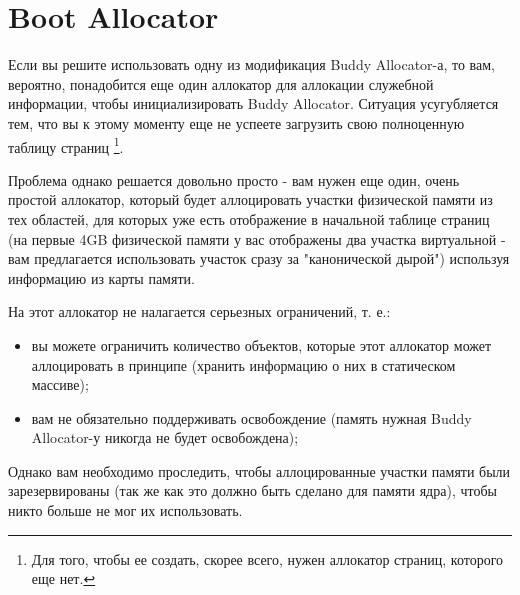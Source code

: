 \section{Boot Allocator}

Если вы решите использовать одну из модификация Buddy Allocator-а, то вам,
вероятно, понадобится еще один аллокатор для аллокации служебной информации,
чтобы инициализировать Buddy Allocator. Ситуация усугубляется тем, что вы к
этому моменту еще не успеете загрузить свою полноценную таблицу страниц
\footnote{Для того, чтобы ее создать, скорее всего, нужен аллокатор страниц,
которого еще нет.}.

Проблема однако решается довольно просто - вам нужен еще один, очень простой
аллокатор, который будет аллоцировать участки физической памяти из тех областей,
для которых уже есть отображение в начальной таблице страниц (на первые 4GB
физической памяти у вас отображены два участка виртуальной - вам предлагается
использовать участок сразу за "канонической дырой") используя информацию из
карты памяти.

На этот аллокатор не налагается серьезных ограничений, т. е.:

\begin{itemize}
  \item вы можете ограничить количество объектов, которые этот аллокатор может
        аллоцировать в принципе (хранить информацию о них в статическом массиве);
  \item вам не обязательно поддерживать освобождение (память нужная Buddy
        Allocator-у никогда не будет освобождена);
\end{itemize}

Однако вам необходимо проследить, чтобы аллоцированные участки памяти были
зарезервированы (так же как это должно быть сделано для памяти ядра), чтобы
никто больше не мог их использовать.

